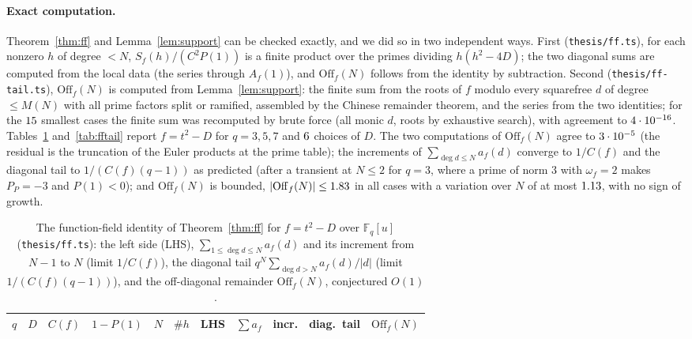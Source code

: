\documentclass[11pt,a4paper]{article}
\theoremstyle{remark}\newtheorem{remark}[theorem]{Remark}
\newcommand{\F}{\mathbb{F}}
\begin{document}
\paragraph{Exact computation.} Theorem~\ref{thm:ff} and Lemma~\ref{lem:support} can be checked exactly,
and we did so in two independent ways. First (\texttt{thesis/ff.ts}), for each nonzero $h$ of degree $<N$,
$S_f(h)/(C^2P(1))$ is a finite product over the primes dividing $h(h^2-4D)$; the two diagonal sums are
computed from the local data (the series through $A_f(1)$), and $\mathrm{Off}_f(N)$ follows from the
identity by subtraction. Second (\texttt{thesis/ff-tail.ts}), $\mathrm{Off}_f(N)$ is computed from
Lemma~\ref{lem:support}: the finite sum from the roots of $f$ modulo every squarefree $d$ of degree
$\le M(N)$ with all prime factors split or ramified, assembled by the Chinese remainder theorem, and the
series from the two identities; for the $15$ smallest cases the finite sum was recomputed by
brute force (all monic $d$, roots by exhaustive search), with agreement to $4\cdot10^{-16}$.
Tables~\ref{tab:ff} and~\ref{tab:fftail} report $f=t^2-D$ for $q=3,5,7$ and $6$ choices of $D$.
The two computations of $\mathrm{Off}_f(N)$ agree to $3\cdot10^{-5}$ (the residual is the truncation of
the Euler products at the prime table); the increments of $\sum_{\deg d\le N}a_f(d)$ converge to
$1/C(f)$ and the diagonal tail to $1/(C(f)(q-1))$ as predicted (after a transient at $N\le2$ for $q=3$,
where a prime of norm $3$ with $\omega_f=2$ makes $P_P=-3$ and $P(1)<0$); and $\mathrm{Off}_f(N)$ is
bounded, $|\mathrm{Off}_f(N)|\le1.83$ in all cases with a variation over $N$ of at most
$1.13$, with no sign of growth.

\begin{table}[htbp]
\centering\footnotesize\setlength{\tabcolsep}{4pt}
\caption{The function-field identity of Theorem~\ref{thm:ff} for $f=t^2-D$ over $\F_q[u]$
(\texttt{thesis/ff.ts}): the left side (LHS), $\sum_{1\le\deg d\le N}a_f(d)$ and its increment from $N-1$
to $N$ (limit $1/C(f)$), the diagonal tail $q^N\sum_{\deg d>N}a_f(d)/|d|$ (limit $1/(C(f)(q-1))$), and
the off-diagonal remainder $\mathrm{Off}_f(N)$, conjectured $O(1)$.}\label{tab:ff}
\begin{tabular}{rlrrrrrrrrr}
\toprule
$q$ & $D$ & $C(f)$ & $1-P(1)$ & $N$ & $\#h$ & LHS & $\sum a_f$ & incr. & diag.\ tail & $\mathrm{Off}_f(N)$\\
\midrule

\end{tabular}
\end{table}
\end{document}
